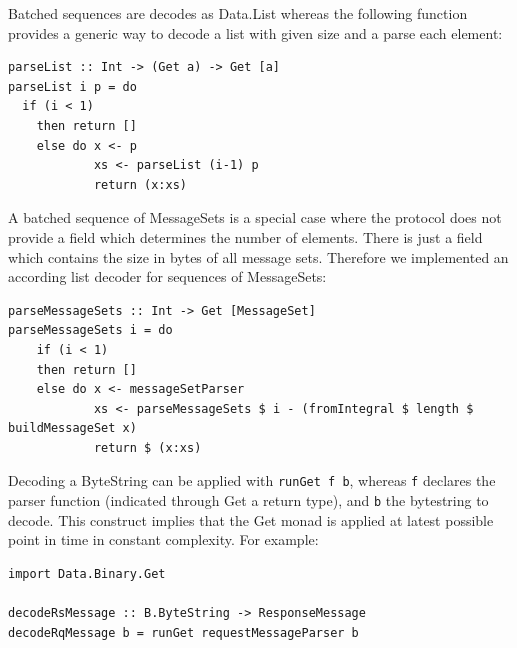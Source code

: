 Batched sequences are decodes as Data.List whereas the following function
provides a generic way to decode a list with given size and a parse each
element:
\begin{lstlisting}
parseList :: Int -> (Get a) -> Get [a]
parseList i p = do 
  if (i < 1) 
    then return []
    else do x <- p
            xs <- parseList (i-1) p
            return (x:xs)
\end{lstlisting}




A batched sequence of MessageSets is a special case where the protocol does not provide a
field which determines the number of elements. There is just a field which contains
the size in bytes of all message sets. Therefore we implemented an according
list decoder for sequences of MessageSets:
\begin{lstlisting}
parseMessageSets :: Int -> Get [MessageSet]
parseMessageSets i = do
    if (i < 1)
    then return []
    else do x <- messageSetParser
            xs <- parseMessageSets $ i - (fromIntegral $ length $ buildMessageSet x)
            return $ (x:xs) 
\end{lstlisting}

Decoding a ByteString can be applied with \lstinline{runGet f b}, whereas
\lstinline{f} declares the parser function (indicated through Get a return type),
and  \lstinline{b} the bytestring to decode. This construct implies that the Get
monad is applied at latest possible point in time in constant complexity. For example: 
\begin{lstlisting}
import Data.Binary.Get

decodeRsMessage :: B.ByteString -> ResponseMessage
decodeRqMessage b = runGet requestMessageParser b

\end{lstlisting}


